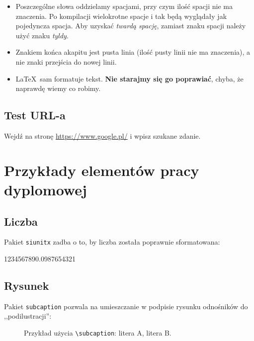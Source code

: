 \begin{itemize}
	\item
	Poszczególne słowa oddzielamy spacjami, przy czym ilość spacji nie ma znaczenia.
	Po kompilacji wielokrotne spacje i tak będą wyglądały jak pojedyncza spacja.
	Aby uzyskać {\em twardą spację}, zamiast znaku spacji należy użyć znaku {\em
		tyldy}.
	
	\item
	Znakiem końca akapitu jest pusta linia (ilość pusty linii nie ma znaczenia), a
	nie znaki przejścia do nowej linii.
	
	\item
	\LaTeX~sam formatuje tekst. \textbf{Nie starajmy się go poprawiać}, chyba, że
	naprawdę wiemy co robimy.
\end{itemize} 


\section{Test URL-a}

Wejdź na stronę \url{https://www.google.pl/} i wpisz szukane zdanie.



\chapter{Przykłady elementów pracy dyplomowej}

\section{Liczba}

Pakiet \texttt{siunitx} zadba o to, by liczba została poprawnie sformatowana: \\
\begin{center}
	\num{1234567890.0987654321}
\end{center}


\section{Rysunek}

Pakiet \texttt{subcaption} pozwala na umieszczanie w podpisie rysunku odnośników do ,,podilustracji'': \\

\begin{figure}[h]
	\centering
	\begin{subfigure}{0.35\textwidth}
		\centering
		\subcaption{\label{subfigure_a}}
	\end{subfigure}
	\begin{subfigure}{0.35\textwidth}
		\centering
		\subcaption{\label{subfigure_b}}
	\end{subfigure}
	
	\caption{\label{fig:subcaption_example}Przykład użycia \texttt{\textbackslash subcaption}: \protect{} litera A, \protect{} litera B.}
\end{figure}

